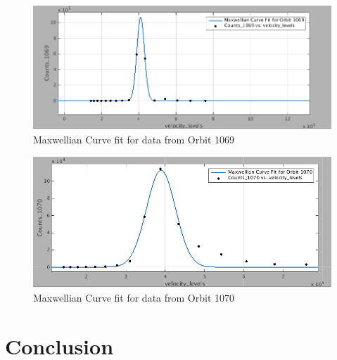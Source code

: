 \documentclass{article}
\begin{document}
\begin{figure}[!ht]
\centering
\includegraphics[scale=0.45]{Figures/curvefit_1069.png}
\caption{Maxwellian Curve fit for data from Orbit 1069}
\label{fig:curvefit_1069}
\end{figure}

\begin{figure}
\centering
\includegraphics[scale= 0.45]{Figures/curvefit_1070.png}
\caption{Maxwellian Curve fit for data from Orbit 1070}
\label{fig:curvefit_1070}
\end{figure}


\section{Conclusion}
\end{document}
